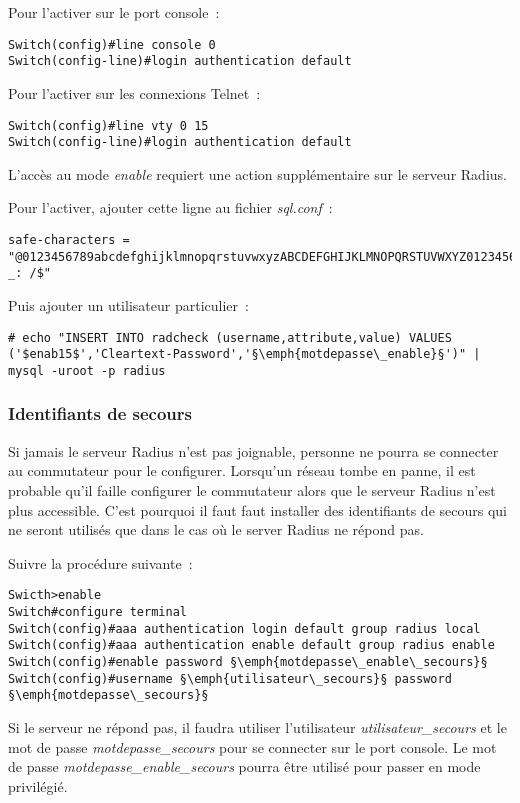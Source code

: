 Pour l'activer sur le port console~:

\begin{lstlisting}
Switch(config)#line console 0
Switch(config-line)#login authentication default
\end{lstlisting}

Pour l'activer sur les connexions Telnet~:

\begin{lstlisting}
Switch(config)#line vty 0 15
Switch(config-line)#login authentication default
\end{lstlisting}

L'accès au mode \textit{enable} requiert une action supplémentaire sur le serveur Radius.

Pour l'activer, ajouter cette ligne au fichier \textit{sql.conf}~:

\begin{lstlisting}
safe-characters = "@0123456789abcdefghijklmnopqrstuvwxyzABCDEFGHIJKLMNOPQRSTUVWXYZ0123456789.-_: /$"
\end{lstlisting}

Puis ajouter un utilisateur particulier~:

\begin{lstlisting}
# echo "INSERT INTO radcheck (username,attribute,value) VALUES ('$enab15$','Cleartext-Password','§\emph{motdepasse\_enable}§')" | mysql -uroot -p radius
\end{lstlisting}

\subsubsection{Identifiants de secours}

Si jamais le serveur Radius n'est pas joignable, personne ne pourra se connecter au commutateur pour le configurer. Lorsqu'un réseau tombe en panne, il est probable qu'il faille configurer le commutateur alors que le serveur Radius n'est plus accessible. C'est pourquoi il faut faut installer des identifiants de secours qui ne seront utilisés que dans le cas où le server Radius ne répond pas.

Suivre la procédure suivante~:

\begin{lstlisting}
Swicth>enable
Switch#configure terminal
Switch(config)#aaa authentication login default group radius local
Switch(config)#aaa authentication enable default group radius enable
Switch(config)#enable password §\emph{motdepasse\_enable\_secours}§
Switch(config)#username §\emph{utilisateur\_secours}§ password §\emph{motdepasse\_secours}§
\end{lstlisting}

Si le serveur ne répond pas, il faudra utiliser l'utilisateur \emph{utilisateur\_secours} et le mot de passe \emph{motdepasse\_secours} pour se connecter sur le port console. Le mot de passe \emph{motdepasse\_enable\_secours} pourra être utilisé pour passer en mode privilégié.
